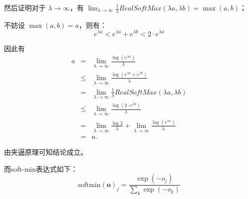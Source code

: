 \documentclass[UTF8]{ctexart}
\begin{document}
	然后证明对于 $\lambda \to \infty$，有 $\displaystyle \lim_{\lambda \to \infty}\frac{1}{\lambda} RealSoftMax(\lambda a, \lambda b) = \max(a, b)$；
	
	不妨设 $\max(a, b) = a$，则有：
	\[
	e^{\lambda a} < e^{\lambda a} + e^{\lambda b} < 2\cdot e^{\lambda a}
	\]
	
	因此有
	\begin{eqnarray*}
		a &=&  \lim_{\lambda \to \infty}\frac{ \log (e^{\lambda a})}{\lambda} \\
		& \leqslant & \lim_{\lambda \to \infty}\frac{\log (e^{\lambda a} + e^{\lambda b})}{\lambda}  \\ 
		&=&\lim_{\lambda \to \infty}\frac{1}{\lambda} RealSoftMax(\lambda a, \lambda b)\\
		& \leqslant & \lim_{\lambda \to \infty}\frac{\log (2\cdot e^{\lambda a} )}{\lambda}  \\
		&=& \lim_{\lambda \to \infty}\frac{\log 2}{\lambda}   + \lim_{\lambda \to \infty}\frac{\log (e^{\lambda a} )}{\lambda}  \\
		&=& a.
	\end{eqnarray*}
	
	由夹逼原理可知结论成立。
	
	而soft-min表达式如下：
	$$
	\text{softmin}(\bm{o}) _j= \frac{\exp(-o_j)}{\sum_k \exp(-o_k)}
	$$
	
\end{document}
